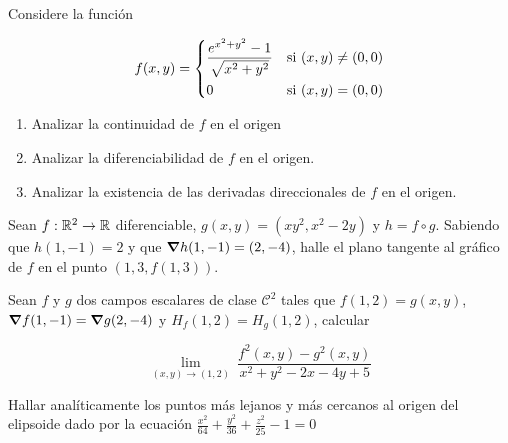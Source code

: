 
\begin{question}
    Considere la función

     \[
        f(x,y) =
        \begin{dcases}
            \frac{e^{x^{2}+y^{2}}-1}{\sqrt{x^{2}+y^{2}}} & \textnormal{si}\ (x,y) \neq (0,0) \\
            0                         & \textnormal{si}\ (x,y) = (0,0)
        \end{dcases}
    \]

    \begin{enumerate}
        \item Analizar la continuidad de $f$ en el origen
        \item Analizar la diferenciabilidad de $f$ en el origen.
        \item Analizar la existencia de las derivadas direccionales de $f$ en el origen.\\
    \end{enumerate}
\end{question}

\begin{question}
    Sean $f:\mathbb{R}^2\to\mathbb{R}$ diferenciable, $g(x,y)=(xy^2,x^2-2y)$ y $h=f\circ g$. Sabiendo que $h(1,-1) = 2$ y que $\grad h(1,-1)=(2,-4)$, halle el plano tangente al gráfico de $f$ en el punto $(1,3,f(1,3))$.
\end{question}
\begin{question}
    Sean $f$ y $g$ dos campos escalares de clase $\mathcal{C}^2$ tales que $f(1,2)=g(x,y)$, $\grad f(1,-1)=\grad g(2,-4)$ y $H_f(1,2)=H_g(1,2)$, calcular 
    
\[
        \lim_{(x,y)\to(1,2)} \
        \frac{f^2(x,y)-g^2(x,y)}{x^2+y^2-2x-4y+5}
    \]
\end{question}
\begin{question}
    Hallar analíticamente los puntos más lejanos y más cercanos al origen del elipsoide dado por la ecuación {\large$\frac{x^2}{64}+\frac{y^2}{36}+\frac{z^2}{25}-1=0$}
\end{question}
\newpage

